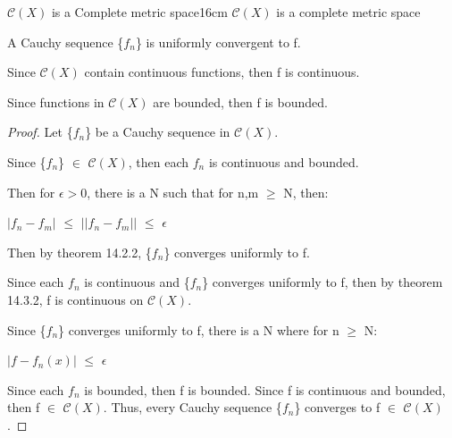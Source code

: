     \vspace{0.5cm}



    \begin{wtheorem}{$\mathscr{C}(X)$ is a Complete metric space}{16cm}
        $\mathscr{C}(X)$ is a complete metric space        
    \end{wtheorem}

    \begin{intuition}
        A Cauchy sequence \{$f_n$\} is uniformly convergent to f.

        Since $\mathscr{C}(X)$ contain continuous functions, then f is continuous.
        
        Since functions in $\mathscr{C}(X)$ are bounded, then f is bounded.
    \end{intuition}

    \vspace{0.1cm}

    \begin{proof}
        Let \{$f_n$\} be a Cauchy sequence in $\mathscr{C}(X)$.

        Since \{$f_n$\} $\in$ $\mathscr{C}(X)$, then each
        $f_n$ is continuous and bounded.

        Then for $\epsilon > 0$, there is a N such that for n,m $\geq$ N, then:

        \hspace{0.5cm}
        $|f_n - f_m|$
        $\leq$ $||f_n - f_m||$
        $\leq$ $\epsilon$

        Then by {\color{red} theorem 14.2.2}, \{$f_n$\} converges uniformly to f.

        Since each $f_n$ is continuous and \{$f_n$\} converges uniformly to f,
        then by {\color{red} theorem 14.3.2}, f is continuous on $\mathscr{C}(X)$.

        Since \{$f_n$\} converges uniformly to f, there is a N where for n $\geq$ N: 

        \hspace{0.5cm}
        $|f - f_n(x)|$ $\leq$ $\epsilon$
        
        Since each $f_n$ is bounded, then f is bounded.
        Since f is continuous and bounded, then f $\in$ $\mathscr{C}(X)$.
        Thus, every Cauchy sequence \{$f_n$\} converges to f $\in$ $\mathscr{C}(X)$.
    \end{proof}

    \newpage





